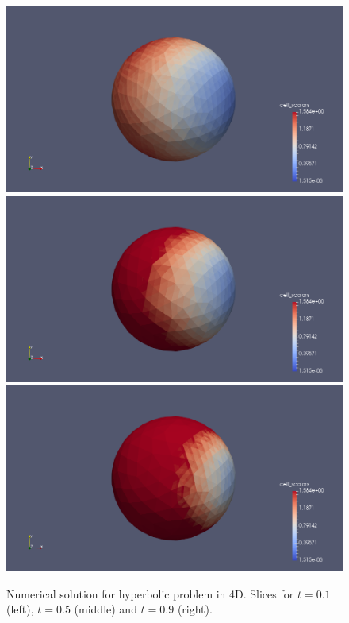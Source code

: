 \documentclass[12pt]{article}
\begin{document}
\begin{figure}[!htb]
  \includegraphics[width=\linewidth]{solution_1.png}
\endminipage\hfill
{}
  \includegraphics[width=\linewidth]{solution_2.png}
\endminipage\hfill
{}
  \includegraphics[width=\linewidth]{solution_3.png}
\endminipage\hfill
\caption{Numerical solution for hyperbolic problem in 4D. Slices for $t = 0.1$ (left), $t = 0.5$ (middle) and $t = 0.9$ (right).}
\end{figure}
\end{document}
